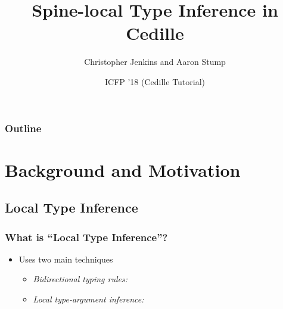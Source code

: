 \documentclass{beamer}
\title{Spine-local Type Inference in Cedille}
\author[Jenkins, Stump]{Christopher Jenkins and Aaron Stump}
\institute[CS, U. Iowa]{Computer Science \\ University of Iowa}
\date{ICFP '18 (Cedille Tutorial)}
\begin{document}
\beamertemplatenavigationsymbolsempty

\begin{frame}
  \titlepage
\end{frame}

\begin{frame}
  \frametitle{Outline}
  \tableofcontents
\end{frame}

\section{Background and Motivation}
\subsection{Local Type Inference}
\begin{frame}
  \frametitle{What is ``Local Type Inference''?}

  \begin{itemize}
  \item Uses two main techniques
    \begin{itemize}
    \item \textit{Bidirectional typing rules:}
    \item \textit{Local type-argument inference:}


    \end{itemize}
  \end{itemize}
\end{frame}
\end{document}
